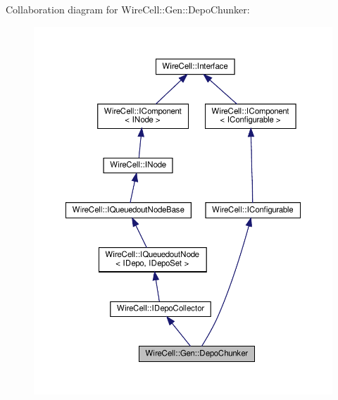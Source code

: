 Collaboration diagram for Wire\+Cell\+:\+:Gen\+:\+:Depo\+Chunker\+:
\nopagebreak
\begin{figure}[H]
\begin{center}
\leavevmode
\includegraphics[width=350pt]{class_wire_cell_1_1_gen_1_1_depo_chunker__coll__graph}
\end{center}
\end{figure}
